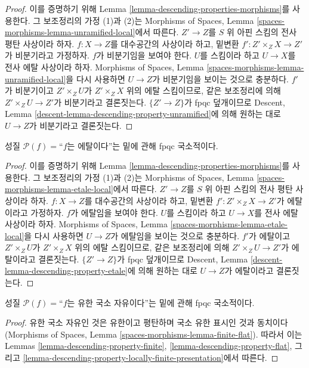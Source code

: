 \begin{proof}
이를 증명하기 위해 Lemma \ref{lemma-descending-properties-morphisms}를
사용한다. 그 보조정리의 가정 (1)과 (2)는 Morphisms of Spaces, Lemma
\ref{spaces-morphisms-lemma-unramified-local}에서 따른다. $Z'\to Z$를
$S$ 위 아핀 스킴의 전사 평탄 사상이라 하자. $f:X\to Z$를 대수공간의
사상이라 하고, 밑변환 $f':Z'\times_ZX\to Z'$가 비분기라고 가정하자.
$f$가 비분기임을 보여야 한다. $U$를 스킴이라 하고 $U\to X$를 전사
에탈 사상이라 하자. Morphisms of Spaces, Lemma
\ref{spaces-morphisms-lemma-unramified-local}을 다시 사용하면 $U\to Z$가
비분기임을 보이는 것으로 충분하다. $f'$가 비분기이고 $Z'\times_ZU$가
$Z'\times_ZX$ 위의 에탈 스킴이므로, 같은 보조정리에 의해
$Z'\times_ZU\to Z'$가 비분기라고 결론짓는다. $\{Z'\to Z\}$가 fpqc
덮개이므로 Descent, Lemma
\ref{descent-lemma-descending-property-unramified}에 의해 원하는 대로
$U\to Z$가 비분기라고 결론짓는다.
\end{proof}

\begin{lemma}
\label{lemma-descending-property-etale}
성질 $\mathcal{P}(f)=$``$f$는 에탈이다''는 밑에 관해 fpqc 국소적이다.
\end{lemma}

\begin{proof}
이를 증명하기 위해 Lemma \ref{lemma-descending-properties-morphisms}를
사용한다. 그 보조정리의 가정 (1)과 (2)는 Morphisms of Spaces, Lemma
\ref{spaces-morphisms-lemma-etale-local}에서 따른다. $Z'\to Z$를 $S$ 위
아핀 스킴의 전사 평탄 사상이라 하자. $f:X\to Z$를 대수공간의 사상이라
하고, 밑변환 $f':Z'\times_ZX\to Z'$가 에탈이라고 가정하자. $f$가
에탈임을 보여야 한다. $U$를 스킴이라 하고 $U\to X$를 전사 에탈
사상이라 하자. Morphisms of Spaces, Lemma
\ref{spaces-morphisms-lemma-etale-local}을 다시 사용하면 $U\to Z$가
에탈임을 보이는 것으로 충분하다. $f'$가 에탈이고 $Z'\times_ZU$가
$Z'\times_ZX$ 위의 에탈 스킴이므로, 같은 보조정리에 의해
$Z'\times_ZU\to Z'$가 에탈이라고 결론짓는다. $\{Z'\to Z\}$가 fpqc
덮개이므로 Descent, Lemma \ref{descent-lemma-descending-property-etale}에
의해 원하는 대로 $U\to Z$가 에탈이라고 결론짓는다.
\end{proof}

\begin{lemma}
\label{lemma-descending-property-finite-locally-free}
성질 $\mathcal{P}(f)=$``$f$는 유한 국소 자유이다''는 밑에 관해 fpqc
국소적이다.
\end{lemma}

\begin{proof}
유한 국소 자유인 것은 유한이고 평탄하며 국소 유한 표시인 것과 동치이다
(Morphisms of Spaces, Lemma \ref{spaces-morphisms-lemma-finite-flat}).
따라서 이는 Lemmas \ref{lemma-descending-property-finite},
\ref{lemma-descending-property-flat}, 그리고
\ref{lemma-descending-property-locally-finite-presentation}에서 따른다.
\end{proof}

